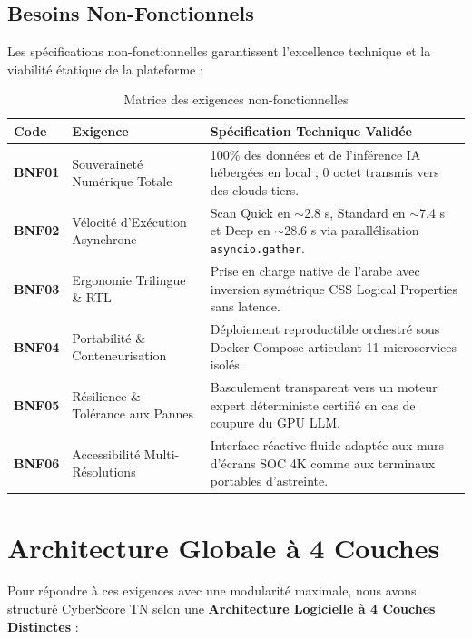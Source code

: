 \subsection{Besoins Non-Fonctionnels}
Les spécifications non-fonctionnelles garantissent l'excellence technique et la viabilité étatique de la plateforme :

\begin{table}[!htbp]
\centering
\caption{Matrice des exigences non-fonctionnelles}
\label{tab:besoins_non_fonctionnels}
\small
\renewcommand{\arraystretch}{1.1}
\begin{tabularx}{\textwidth}{l p{4cm} X}
\toprule
\textbf{Code} & \textbf{Exigence} & \textbf{Spécification Technique Validée} \\
\midrule
\textbf{BNF01} & Souveraineté Numérique Totale & 100\% des données et de l'inférence IA hébergées en local ; 0 octet transmis vers des clouds tiers. \\
\textbf{BNF02} & Vélocité d'Exécution Asynchrone & Scan Quick en $\sim$2.8 s, Standard en $\sim$7.4 s et Deep en $\sim$28.6 s via parallélisation \texttt{asyncio.gather}. \\
\textbf{BNF03} & Ergonomie Trilingue \& RTL & Prise en charge native de l'arabe avec inversion symétrique CSS Logical Properties sans latence. \\
\textbf{BNF04} & Portabilité \& Conteneurisation & Déploiement reproductible orchestré sous Docker Compose articulant 11 microservices isolés. \\
\textbf{BNF05} & Résilience \& Tolérance aux Pannes & Basculement transparent vers un moteur expert déterministe certifié en cas de coupure du GPU LLM. \\
\textbf{BNF06} & Accessibilité Multi-Résolutions & Interface réactive fluide adaptée aux murs d'écrans SOC 4K comme aux terminaux portables d'astreinte. \\
\bottomrule
\end{tabularx}
\end{table}

\section{Architecture Globale à 4 Couches}
Pour répondre à ces exigences avec une modularité maximale, nous avons structuré CyberScore TN selon une \textbf{Architecture Logicielle à 4 Couches Distinctes} :

